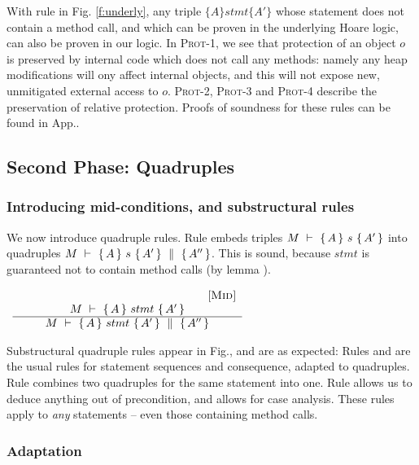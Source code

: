 With rule {} in Fig. \ref{f:underly},  any triple $ \{ A \} stmt \{ A' \} $  whose statement does not contain a method call, and which 
can be proven in the underlying Hoare logic, can also be proven in our logic.  
In \textsc{Prot-1}, we see that  protection of an object $o$ is preserved by internal code which does not call any methods: namely any heap modifications will
ony affect internal objects, and this will not expose new, unmitigated external access to $o$.
 \textsc{Prot-2}, \textsc{Prot-3} and \textsc{Prot-4} describe the preservation of relative protection.
Proofs of soundness for these rules can be found in App.. 
    
 
\subsection{Second Phase: Quadruples}
\label{s:hoare:second}

\subsubsection{Introducing  mid-conditions, and substructural rules}
We now introduce  quadruple rules.  
Rule {} embeds  triples  ${M\ \vdash\ \{\,A\, \} \ s\  \{\,A'\, \} }$  into quadruples ${M\ \vdash\ \{\,A\, \} \ s\  \{\,A'\, \}\, \,\parallel\,\, \{\, A'' \, \} }$.
This is sound, because $stmt$ is guaranteed not to contain method calls (by lemma ).

\begin{center}
$
\begin{array}{c}
\begin{array}{c} \strut \ \ \ \ \ \ \ \ \ \ \ \ \ \ \ \ \ \ \ \ \ \ \ \ \ \ \ \ \ \ \ \ \ \ \ \ \ \ \ \ \ \ \ \ \ \ \ \ \ \ {{\mbox{[\sc{Mid}]}}} \\ M\ \vdash\ \{\,A\, \} \ stmt\  \{\,A'\, \}  \\ \hline M\ \vdash\ \{\,A\, \} \ stmt\  \{\,A'\, \}\, \,\parallel\,\, \{\, A'' \, \}  \end{array}
  \end{array}
 $
 \end{center}
 
Substructural quadruple rules appear in  Fig., and are as expected: 
Rules   {} and {} are  the usual rules for statement sequences and consequence, adapted to quadruples.
Rule {} combines two quadruples for the same statement into one.
Rule  {} allows us to deduce anything out of  precondition, and  {} allows for case analysis.
These  rules  apply to \emph{any} statements -- even those containing method calls.

\subsubsection{Adaptation}

